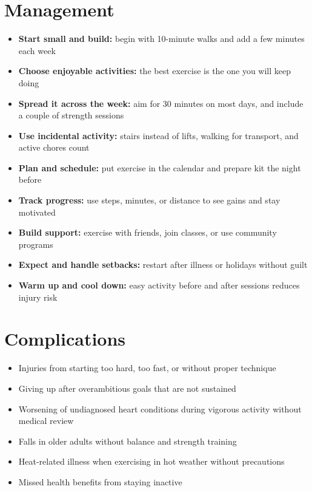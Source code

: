 \section*{Management}
\begin{itemize}
    \item \textbf{Start small and build:} begin with 10-minute walks and add a few minutes each week
    \item \textbf{Choose enjoyable activities:} the best exercise is the one you will keep doing
    \item \textbf{Spread it across the week:} aim for 30 minutes on most days, and include a couple of strength sessions
    \item \textbf{Use incidental activity:} stairs instead of lifts, walking for transport, and active chores count
    \item \textbf{Plan and schedule:} put exercise in the calendar and prepare kit the night before
    \item \textbf{Track progress:} use steps, minutes, or distance to see gains and stay motivated
    \item \textbf{Build support:} exercise with friends, join classes, or use community programs
    \item \textbf{Expect and handle setbacks:} restart after illness or holidays without guilt
    \item \textbf{Warm up and cool down:} easy activity before and after sessions reduces injury risk
\end{itemize}

\section*{Complications}
\begin{itemize}
    \item Injuries from starting too hard, too fast, or without proper technique
    \item Giving up after overambitious goals that are not sustained
    \item Worsening of undiagnosed heart conditions during vigorous activity without medical review
    \item Falls in older adults without balance and strength training
    \item Heat-related illness when exercising in hot weather without precautions
    \item Missed health benefits from staying inactive
\end{itemize}

